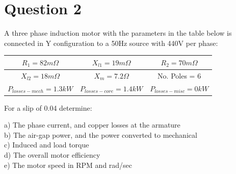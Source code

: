 \documentclass{article}
\begin{document}
\section{Question 2}
A three phase induction motor with the parameters in the table below is connected in Y configuration to a 50Hz source with 440V per phase:
\begin{center}
 \begin{tabular}{| c | c | c |} 
 \hline
 $R_1 = 82m \Omega$ & $X_{l1} = 19 m\Omega$ & $R_2 = 70m\Omega$\\ 
 \hline
 $X_{l2} = 18m\Omega$ & $X_m = 7.2 \Omega$ & No. Poles = 6 \\ 
 \hline
 $P_{losses-mech} = 1.3kW$ & $P_{losses-core} = 1.4kW$ & $P_{losses-misc} = 0kW$\\
 \hline
\end{tabular}
\end{center}
For a slip of 0.04 determine:
\begin{itemize}
    a) The phase current, and copper losses at the armature\\
    b) The air-gap power, and the power converted to mechanical\\
    c) Induced and load torque\\
    d) The overall motor efficiency\\
    e) The motor speed in RPM and rad/sec
\end{itemize}
\end{document}
